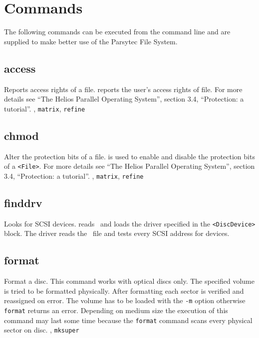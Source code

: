 \chapter{Commands} \label{chap:commands}

The following commands can be executed from the command line and are supplied to
make better use of the Parsytec File System.

\section{access}
\begin{man}
  \PP Reports access rights of a file.
   reports the user's access rights of file. For more details
      see ``The Helios Parallel Operating System'', section 3.4,
      ``Protection: a tutorial''.
  , {\tt matrix}, {\tt refine}
\end{man}

\section{chmod}
\begin{man}
  \PP Alter the protection bits of a file.
   is used to enable and disable the protection bits of a
             {\tt <File>}. For more details see ``The Helios Parallel Operating
             System'', section 3.4, ``Protection: a tutorial''.
  , {\tt matrix}, {\tt refine}
\end{man}

\section{finddrv}
\begin{man}
  \PP Looks for SCSI devices.
   reads \HEDI\ and loads the driver specified
             in the {\tt <DiscDevice>} block. The driver reads the
             \HESI\ file and tests every SCSI address for devices.
\end{man}

\section{format}
\begin{man}
  \PP Format a disc.
  \DE This command works with optical discs only.
             The specified volume is tried to be formatted physically. After
             formatting each sector is verified and reassigned on error. The
             volume has to be loaded with the {\tt -m} option otherwise {\tt format}
             returns an error. Depending on medium size the execution of this
             command may last some time because the {\tt format} command scans every
             physical sector on disc.
  , {\tt mksuper}
\end{man}


